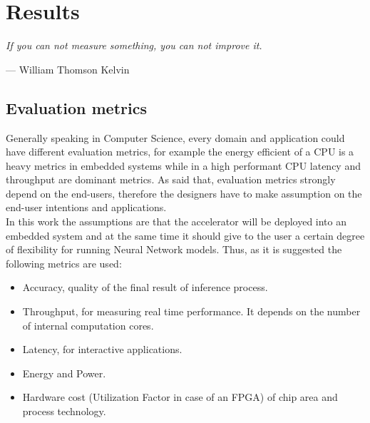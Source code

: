 \chapter{Results}

\epigraph{ \textit{If you can not measure something, you can not improve it.}}{--- \textup{William Thomson Kelvin}}

\section{Evaluation metrics}
Generally speaking in Computer Science, every domain and application could have different evaluation metrics, for example the energy efficient of a CPU is a heavy metrics in embedded systems while in a high performant CPU latency and throughput are dominant metrics. As said that, evaluation metrics strongly depend on the end-users, therefore the designers have to make assumption on the end-user intentions and applications.\\
In this work the assumptions are that the accelerator will be deployed into an embedded system and at the same time it should give to the user a certain degree of flexibility for running Neural Network models. Thus, as it is suggested \cite{paper:1} the following metrics are used:
\begin{itemize}
\item Accuracy, quality of the final result of inference process.
\item Throughput, for measuring real time performance. It depends on the number of internal computation cores.
\item Latency, for interactive applications.
\item Energy and Power.
\item Hardware cost (Utilization Factor in case of an FPGA) of chip area and process technology.
\end{itemize}
\newpage
